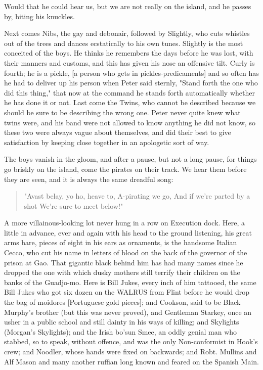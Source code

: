 Would that he could hear us, but we are not really on the island, and he
passes by, biting his knuckles.


Next comes Nibs, the gay and debonair, followed by Slightly, who cuts
whistles out of the trees and dances ecstatically to his own tunes.
Slightly is the most conceited of the boys. He thinks he remembers the
days before he was lost, with their manners and customs, and this has
given his nose an offensive tilt. Curly is fourth; he is a pickle, [a
person who gets in pickles-predicaments] and so often has he had to
deliver up his person when Peter said sternly, "Stand forth the one who
did this thing," that now at the command he stands forth automatically
whether he has done it or not. Last come the Twins, who cannot be
described because we should be sure to be describing the wrong one. Peter
never quite knew what twins were, and his band were not allowed to know
anything he did not know, so these two were always vague about themselves,
and did their best to give satisfaction by keeping close together in an
apologetic sort of way.


The boys vanish in the gloom, and after a pause, but not a long pause, for
things go briskly on the island, come the pirates on their track. We hear
them before they are seen, and it is always the same dreadful song:

\begin{verse}
     "Avast belay, yo ho, heave to,
     A-pirating we go,
     And if we're parted by a shot
     We're sure to meet below!"
\end{verse}

A more villainous-looking lot never hung in a row on Execution dock. Here,
a little in advance, ever and again with his head to the ground listening,
his great arms bare, pieces of eight in his ears as ornaments, is the
handsome Italian Cecco, who cut his name in letters of blood on the back
of the governor of the prison at Gao. That gigantic black behind him has
had many names since he dropped the one with which dusky mothers still
terrify their children on the banks of the Guadjo-mo. Here is Bill Jukes,
every inch of him tattooed, the same Bill Jukes who got six dozen on the
WALRUS from Flint before he would drop the bag of moidores [Portuguese
gold pieces]; and Cookson, said to be Black Murphy's brother (but this was
never proved), and Gentleman Starkey, once an usher in a public school and
still dainty in his ways of killing; and Skylights (Morgan's Skylights);
and the Irish bo'sun Smee, an oddly genial man who stabbed, so to speak,
without offence, and was the only Non-conformist in Hook's crew; and
Noodler, whose hands were fixed on backwards; and Robt. Mullins and Alf
Mason and many another ruffian long known and feared on the Spanish Main.


